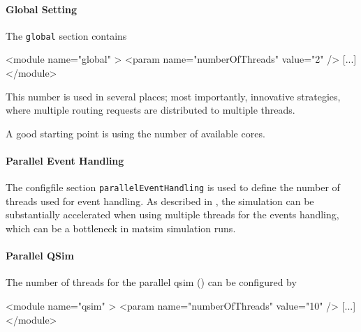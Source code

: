 \paragraph{Global Setting}

The \lstinline{global} section contains
\begin{xml}
<module name="global" >
    <param name="numberOfThreads" value="2" />
    [...]
</module>
\end{xml}
This number is used in several places; most importantly, innovative strategies, where multiple routing requests are distributed to multiple threads.

A good starting point is using the number of available cores.

\paragraph{Parallel Event Handling}
\label{sec:using-paralleleventhandling}

The \gls{configfile} section \lstinline|parallelEventHandling| is used to define the number of threads used for event handling. 
As described in \citet[][]{WaraichEtAl_STRC_2009}, the simulation can be substantially accelerated when using multiple threads for the events handling, which can be a bottleneck in \gls{matsim} simulation runs.


\paragraph{Parallel QSim}

The number of threads for the parallel \gls{qsim} (\cf \cite{Dobler_PhDThesis_2013}) can be configured by
\begin{xml}
<module name="qsim" >
    <param name="numberOfThreads" value="10" />
    [...]
</module>
\end{xml}

